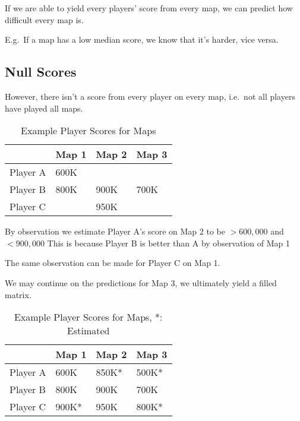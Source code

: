 If we are able to yield every players' score from every map, we can predict how difficult every map is.

E.g.\ If a map has a low median score, we know that it's harder, vice versa.

\subsection{Null Scores}\label{subsec:null-scores}

However, there isn't a score from every player on every map, i.e.\ not all players have played all maps.

\begin{table}[H]
    \centering
    \begin{tabular}{llll}
        \toprule
        \textbf{} & \textbf{Map 1} & \textbf{Map 2} & \textbf{Map 3} \\
        \midrule
        Player A & 600K &  & \\
        Player B & 800K & 900K & 700K  \\
        Player C &  & 950K &  \\
        \bottomrule
    \end{tabular}
    \caption{Example Player Scores for Maps}
    \label{tab:eg_scores}
\end{table}

By observation we estimate Player A's score on Map 2 to be $>600,000$ and $<900,000$
This is because Player B is better than A by observation of Map 1

The same observation can be made for Player C on Map 1.

We may continue on the predictions for Map 3, we ultimately yield a filled matrix.

\begin{table}[H]
    \centering
    \begin{tabular}{llll}
        \toprule
        \textbf{} & \textbf{Map 1} & \textbf{Map 2} & \textbf{Map 3} \\
        \midrule
        Player A & 600K & 850K* & 500K* \\
        Player B & 800K & 900K & 700K \\
        Player C & 900K* & 950K & 800K* \\
        \bottomrule
    \end{tabular}
    \caption{Example Player Scores for Maps, *: Estimated}
    \label{tab:eg_scores_est}
\end{table}

